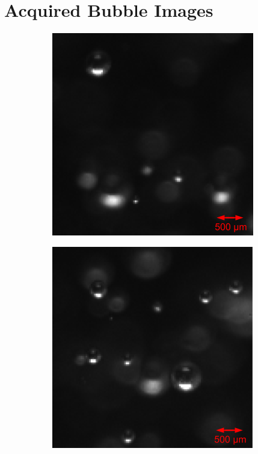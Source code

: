		
		
	\section{Acquired Bubble Images}\label{measurement_results}
		\begin{figure}[h]			
			\begin{subfigure}[t]{.4\textwidth}
				\centering
				\includegraphics[scale=0.5]{images/aq_result_low_small_1.png}
				\caption{}
				\label{subfig:low_a}
			\end{subfigure}\hfill
			\begin{subfigure}[t]{.4\textwidth}
				\centering
				\includegraphics[scale=0.5]{images/aq_result_low_small_2.png}				
				\caption{}
				\label{subfig:low_b}				
			\end{subfigure}
			

\end{figure}
